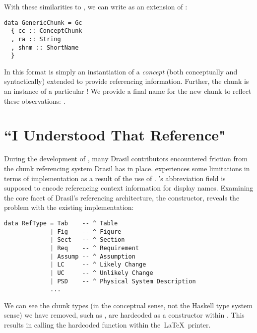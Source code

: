 With these similarities to , we can write  as an extension of :
\begin{tcolorbox}
\begin{verbatim}
data GenericChunk = Gc
  { cc :: ConceptChunk
  , ra :: String
  , shnm :: ShortName
  }
\end{verbatim}
\end{tcolorbox}

In this format  is simply an instantiation of a \textit{concept} (both conceptually and syntactically) extended to provide referencing information. Further, the chunk is an instance of a particular ! We provide a final name for the new chunk to reflect these observations: .


\section{``I Understood That Reference"}\label{ciRefProg}
During the development of , many Drasil contributors encountered friction from the chunk referencing system Drasil has in place.  experiences some limitations in terms of implementation as a result of the use of . 's abbreviation field is supposed to encode referencing context information for display names. Examining the core facet of Drasil's referencing architecture, the  constructor, reveals the problem with the existing implementation:

\begin{tcolorbox}
\begin{verbatim}
data RefType = Tab    -- ^ Table
             | Fig    -- ^ Figure
             | Sect   -- ^ Section
             | Req    -- ^ Requirement
             | Assump -- ^ Assumption
             | LC     -- ^ Likely Change
             | UC     -- ^ Unlikely Change
             | PSD    -- ^ Physical System Description
             ...
\end{verbatim}
\end{tcolorbox}

We can see the chunk types (in the conceptual sense, not the Haskell type system sense) we have removed, such as , are hardcoded as a constructor within . This results in calling the hardcoded function  within the\ \LaTeX\ printer.

